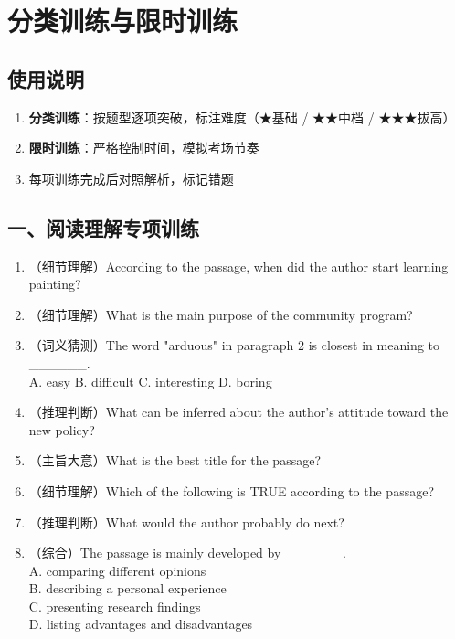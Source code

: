 \section{分类训练与限时训练}

\subsection{使用说明}

\begin{enumerate}
  \item \textbf{分类训练}：按题型逐项突破，标注难度（★基础 / ★★中档 / ★★★拔高）
  \item \textbf{限时训练}：严格控制时间，模拟考场节奏
  \item 每项训练完成后对照解析，标记错题
\end{enumerate}

\subsection{一、阅读理解专项训练}

\begin{enumerate}
  \item[★]（细节理解）According to the passage, when did the author start learning painting?
  \item[★]（细节理解）What is the main purpose of the community program?
  \item[★]（词义猜测）The word "arduous" in paragraph 2 is closest in meaning to \_\_\_\_\_\_. \\
  A. easy \quad B. difficult \quad C. interesting \quad D. boring
  \item[★★]（推理判断）What can be inferred about the author's attitude toward the new policy?
  \item[★★]（主旨大意）What is the best title for the passage?
  \item[★★]（细节理解）Which of the following is TRUE according to the passage?
  \item[★★]（推理判断）What would the author probably do next?
  \item[★★★]（综合）The passage is mainly developed by \_\_\_\_\_\_. \\
  A. comparing different opinions \\
  B. describing a personal experience \\
  C. presenting research findings \\
  D. listing advantages and disadvantages
\end{enumerate}

